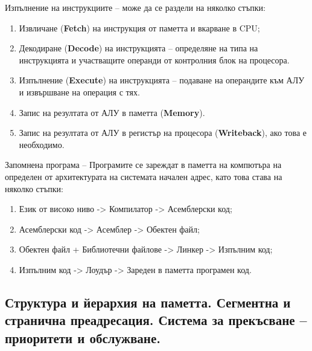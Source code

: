 \documentclass{article}
\begin{document}
Изпълнение на инструкциите – може да се раздели на няколко стъпки:
\begin{enumerate}
    \item Извличане (\textbf{Fetch}) на инструкция от паметта и вкарване в CPU;
    \item Декодиране (\textbf{Decode}) на инструкцията – определяне на типа на инструкцията и участващите операнди от контролния блок на процесора.
    \item Изпълнение (\textbf{Execute}) на инструкцията – подаване на операндите към АЛУ и извършване на операция с тях.
    \item Запис на резултата от АЛУ в паметта (\textbf{Memory}).
    \item Запис на резултата от АЛУ в регистър на процесора (\textbf{Writeback}), ако това е необходимо.
\end{enumerate}
Запомнена програма – Програмите се зареждат в паметта на компютъра на определен от архитектурата на системата начален адрес,
като това става на няколко стъпки:
\begin{enumerate}
    \item Език от високо ниво -> Компилатор -> Асемблерски код;
    \item Асемблерски код -> Асемблер -> Обектен файл;
    \item Обектен файл + Библиотечни файлове -> Линкер -> Изпълним код;
    \item Изпълним код -> Лоудър -> Зареден в паметта програмен код.
\end{enumerate}

\subsection*{Структура и йерархия на паметта. Сегментна и странична преадресация. Система за прекъсване – приоритети и обслужване.}
\end{document}
